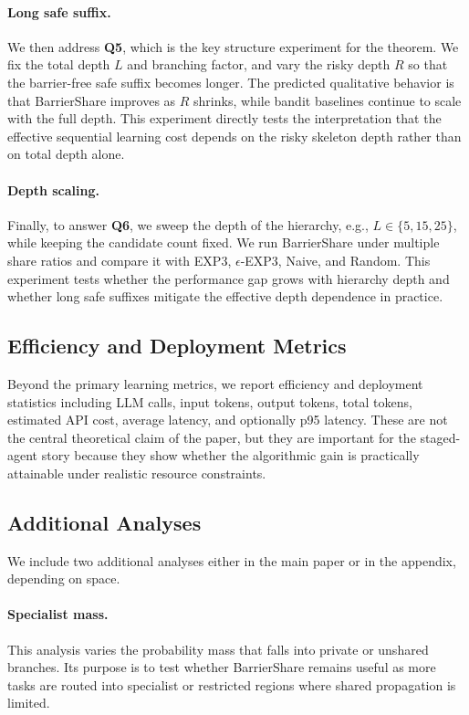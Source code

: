 \documentclass{article}
\begin{document}
\paragraph{Long safe suffix.}
We then address \textbf{Q5}, which is the key structure experiment for the theorem. We fix the total depth $L$ and branching factor, and vary the risky depth $R$ so that the barrier-free safe suffix becomes longer. The predicted qualitative behavior is that BarrierShare improves as $R$ shrinks, while bandit baselines continue to scale with the full depth. This experiment directly tests the interpretation that the effective sequential learning cost depends on the risky skeleton depth rather than on total depth alone.

\paragraph{Depth scaling.}
Finally, to answer \textbf{Q6}, we sweep the depth of the hierarchy, e.g., $L \in \{5, 15, 25\}$, while keeping the candidate count fixed. We run BarrierShare under multiple share ratios and compare it with EXP3, $\epsilon$-EXP3, Naive, and Random. This experiment tests whether the performance gap grows with hierarchy depth and whether long safe suffixes mitigate the effective depth dependence in practice.

\subsection{Efficiency and Deployment Metrics}

Beyond the primary learning metrics, we report efficiency and deployment statistics including LLM calls, input tokens, output tokens, total tokens, estimated API cost, average latency, and optionally p95 latency. These are not the central theoretical claim of the paper, but they are important for the staged-agent story because they show whether the algorithmic gain is practically attainable under realistic resource constraints.

\subsection{Additional Analyses}

We include two additional analyses either in the main paper or in the appendix, depending on space.

\paragraph{Specialist mass.}
This analysis varies the probability mass that falls into private or unshared branches. Its purpose is to test whether BarrierShare remains useful as more tasks are routed into specialist or restricted regions where shared propagation is limited.
\end{document}
